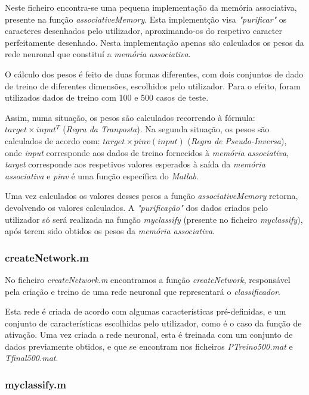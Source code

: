 \documentclass{article}
\begin{document}
Neste ficheiro encontra-se uma pequena implementação da memória associativa, presente na função \emph{associativeMemory}. Esta implementção visa \emph{"purificar"} os caracteres desenhados pelo utilizador, aproximando-os do respetivo caracter perfeitamente desenhado. Nesta implementação apenas são calculados os pesos da rede neuronal que constituí a \emph{memória associativa}.

O cálculo dos pesos é feito de duas formas diferentes, com dois conjuntos de dado de treino de diferentes dimensões, escolhidos pelo utilizador. Para o efeito, foram utilizados dados de treino com 100 e 500 casos de teste.

Assim, numa situação, os pesos são calculados recorrendo à fórmula: $target\times input^T$ (\emph{Regra da Tranposta}). Na segunda situação, os pesos são calculados de acordo com: $target\times pinv(input)$ (\emph{Regra de Pseudo-Inversa}), onde \emph{input} corresponde aos dados de treino fornecidos à \emph{memória associativa}, \emph{target} corresponde aos respetivos valores esperados à saída da \emph{memória associativa} e \emph{pinv} é uma função específica do \emph{Matlab}.

Uma vez calculados os valores desses pesos a função \emph{associativeMemory} retorna, devolvendo os valores calculados. A \emph{"purificação"} dos dados criados pelo utilizador só será realizada na função \emph{myclassify} (presente no ficheiro \emph{myclassify}), após terem sido obtidos os pesos da \emph{memória associativa}.

\subsubsection{createNetwork.m}

No ficheiro \emph{createNetwork.m} encontramos a função \emph{createNetwork}, responsável pela criação e treino de uma rede neuronal que representará o \emph{classificador}.

Esta rede é criada de acordo com algumas características pré-definidas, e um conjunto de características escolhidas pelo utilizador, como é o caso da função de ativação. Uma vez criada a rede neuronal, esta é treinada com um conjunto de dados previamente obtidos, e que se encontram nos ficheiros \emph{PTreino500.mat} e \emph{Tfinal500.mat}.

\subsubsection{myclassify.m}
\end{document}
